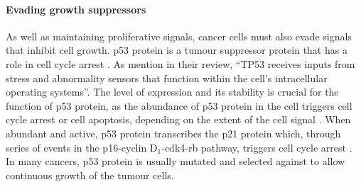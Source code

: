 \paragraph{Evading growth suppressors}

\noindent
As well as maintaining proliferative signals, cancer cells must also evade signals that inhibit cell growth.
p53 protein is a tumour suppressor protein that has a  role in cell cycle arrest \citep{Hanahan2011,Levine1997}.
As \citet{Hanahan2011} mention in their review, ``TP53 receives inputs from stress and abnormality sensors that function within the cell's intracellular operating systems''.
The level of expression and its stability is crucial for the function of p53 protein, as the abundance of p53 protein in the cell triggers cell cycle arrest or cell \gls{apoptosis}, depending on the extent of the cell signal \citep{Fridman2003,Hanahan2011,Levine1997}.
When abundant and active, p53 protein transcribes the p21 protein which, through series of events in the p16-cyclin D$_1$-cdk4-\gls{rb} pathway, triggers cell cycle arrest \citep{Levine1997}.
In many cancers, p53 protein is usually mutated and selected against to allow continuous growth of the tumour cells.




